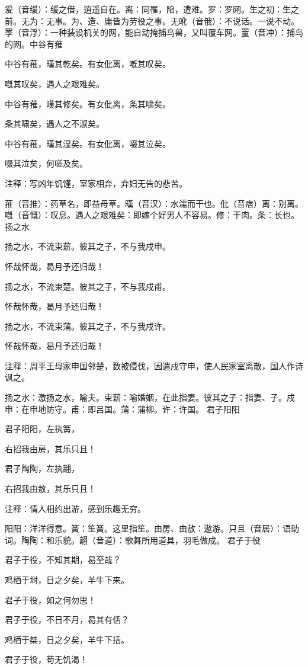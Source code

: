 \documentclass[12pt,UTF8]{ctexbook}
\begin{document}
爰（音缓）：缓之借，逍遥自在。离：同罹，陷，遭难。罗：罗网。生之初：生之前。无为：无事。为、造、庸皆为劳役之事。无吪（音俄）：不说话。一说不动。罦（音浮）：一种装设机关的网，能自动掩捕鸟兽，又叫覆车网。罿（音冲）：捕鸟的网。中谷有蓷

中谷有蓷，暵其乾矣。有女仳离，嘅其叹矣。

嘅其叹矣，遇人之艰难矣。

中谷有蓷，暵其修矣。有女仳离，条其啸矣。

条其啸矣，遇人之不淑矣。

中谷有蓷，暵其湿矣。有女仳离，啜其泣矣。

啜其泣矣，何嗟及矣。

注释：写凶年饥馑，室家相弃，弃妇无告的悲苦。

蓷（音推）：药草名，即益母草。暵（音汉）：水濡而干也。仳（音痞）离：别离。嘅（音慨）：叹息。遇人之艰难矣：即嫁个好男人不容易。修：干肉。条：长也。扬之水

扬之水，不流束薪。彼其之子，不与我戍申。

怀哉怀哉，曷月予还归哉！

扬之水，不流束楚。彼其之子，不与我戍甫。

怀哉怀哉，曷月予还归哉！

扬之水，不流束蒲。彼其之子，不与我戍许。

怀哉怀哉，曷月予还归哉！

注释：周平王母家申国邻楚，数被侵伐，因遣戍守申，使人民家室离散，国人作诗讽之。

扬之水：激扬之水，喻夫。束薪：喻婚姻，在此指妻。彼其之子：指妻、子。戍申：在申地防守。甫：即吕国。蒲：蒲柳。许：许国。 君子阳阳

君子阳阳，左执簧，

右招我由房，其乐只且！

君子陶陶，左执翿，

右招我由敖，其乐只且！

注释：情人相约出游，感到乐趣无穷。

阳阳：洋洋得意。簧：笙簧。这里指笙。由房、由敖：遨游。只且（音居）：语助词。陶陶：和乐貌。翿（音道）：歌舞所用道具，羽毛做成。 君子于役

君子于役，不知其期，曷至哉？

鸡栖于埘，日之夕矣，羊牛下来。

君子于役，如之何勿思！

君子于役，不日不月，曷其有佸？

鸡栖于桀，日之夕矣，羊牛下括。

君子于役，苟无饥渴！
\end{document}
